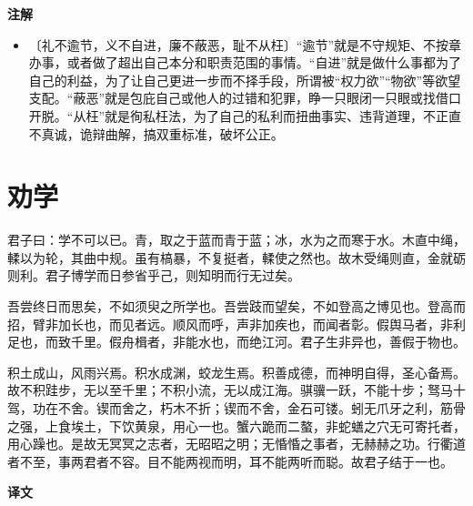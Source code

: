 \documentclass[12pt,UTF-8,openany,a4]{ctexbook}
\begin{document}
\newpage

\begin{Large}
    \noindent\textbf{注解}
\end{Large}


\vspace{-1em}

\begin{itemize}
    \setlength\itemsep{-0.2em}
    \item〔礼不逾节，义不自进，廉不蔽恶，耻不从枉〕{\yiwen “逾节”就是不守规矩、不按章办事，或者做了超出自己本分和职责范围的事情。“自进”就是做什么事都为了自己的利益，为了让自己更进一步而不择手段，所谓被“权力欲”“物欲”等欲望支配。“蔽恶”就是包庇自己或他人的过错和犯罪，睁一只眼闭一只眼或找借口开脱。“从枉”就是徇私枉法，为了自己的私利而扭曲事实、违背道理，不正直不真诚，诡辩曲解，搞双重标准，破坏公正。}
\end{itemize}

\chapter{劝学}

\begin{large}
    
    君子曰：学不可以已。青，取之于蓝而青于蓝；冰，水为之而寒于水。木直中绳，輮以为轮，其曲中规。虽有槁暴，不复挺者，輮使之然也。故木受绳则直，金就砺则利。君子博学而日参省乎己，则知明而行无过矣。
    
    吾尝终日而思矣，不如须臾之所学也。吾尝跂而望矣，不如登高之博见也。登高而招，臂非加长也，而见者远。顺风而呼，声非加疾也，而闻者彰。假舆马者，非利足也，而致千里。假舟楫者，非能水也，而绝江河。君子生非异也，善假于物也。
    
    积土成山，风雨兴焉。积水成渊，蛟龙生焉。积善成德，而神明自得，圣心备焉。故不积跬步，无以至千里；不积小流，无以成江海。骐骥一跃，不能十步；驽马十驾，功在不舍。锲而舍之，朽木不折；锲而不舍，金石可镂。蚓无爪牙之利，筋骨之强，上食埃土，下饮黄泉，用心一也。蟹六跪而二螯，非蛇蟮之穴无可寄托者，用心躁也。是故无冥冥之志者，无昭昭之明；无惛惛之事者，无赫赫之功。行衢道者不至，事两君者不容。目不能两视而明，耳不能两听而聪。故君子结于一也。
\end{large}


\newpage

\begin{Large}
    \noindent\textbf{译文}
\end{Large}


\vspace{1em}
\end{document}
